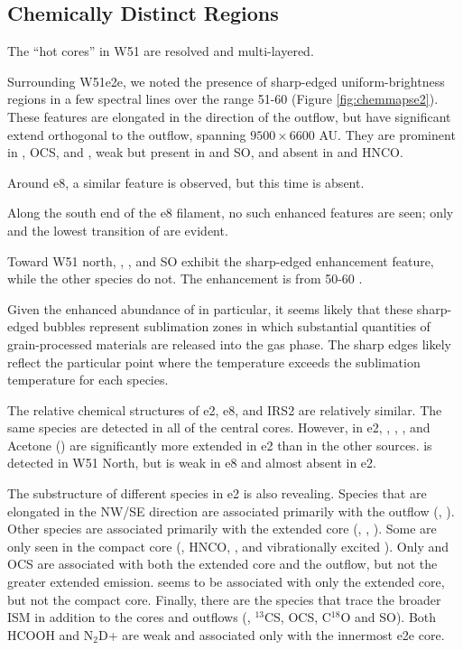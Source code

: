 \documentclass{aa}
\begin{document}

\subsection{Chemically Distinct Regions}
\label{sec:chemistrymaps}
The ``hot cores'' in W51 are resolved and multi-layered.


Surrounding W51e2e, we noted the presence of sharp-edged uniform-brightness
regions in a few spectral lines over the range 51-60 \kms (Figure
\ref{fig:chemmapse2}).  These features are elongated in the direction of the
outflow, but have significant extend orthogonal to the outflow, spanning
$9500\times6600$ AU.  They are prominent in \methanol, OCS, and \dimethylether, weak
but present in \formaldehyde and SO, and absent in \cyanoacetylene and HNCO.

Around e8, a similar feature is observed, but this time \dimethylether is absent.

Along the south end of the e8 filament, no such enhanced features are seen; only
\formaldehyde and the lowest transition of \methanol are evident.

Toward W51 north, \methanol, \formaldehyde, and SO exhibit the sharp-edged enhancement feature,
while the other species do not.  The enhancement is from 50-60 \kms.

Given the enhanced abundance of \methanol in particular, it seems likely that these
sharp-edged bubbles represent sublimation zones in which substantial quantities
of grain-processed materials are released into the gas phase.  The sharp edges
likely reflect the particular point where the temperature exceeds the sublimation
temperature for each species.

The relative chemical structures of e2, e8, and IRS2 are relatively similar.
The same species are detected in all of the central cores.  However, in e2,
\dimethylether, \methylformate, \ethylcyanide, and Acetone (\acetone) are
significantly more extended in e2 than in the other sources.
\gaucheethanol is detected in W51 North, but is weak in e8 and almost absent
in e2.

The substructure of different species in e2 is also revealing.  Species that
are elongated in the NW/SE direction are associated primarily with the outflow
(\cyanoacetylene, \ethylcyanide).  Other species are associated primarily with
the extended core (\methylformate, \dimethylether, \acetone).  Some are only
seen in the compact core (\methyleneamidogen, HNCO, \formamide, and
vibrationally excited \cyanoacetylene).  Only \methanol and OCS are associated
with both the extended core and the outflow, but not the greater extended
emission.  \ketene seems to be associated with only the extended core, but not
the compact core. Finally, there are the species that trace the broader ISM in
addition to the cores and outflows (\formaldehyde, $^{13}$CS, OCS, C$^{18}$O
and SO).  Both HCOOH and N$_2$D+ are weak and associated only with the innermost
e2e core.
\end{document}
